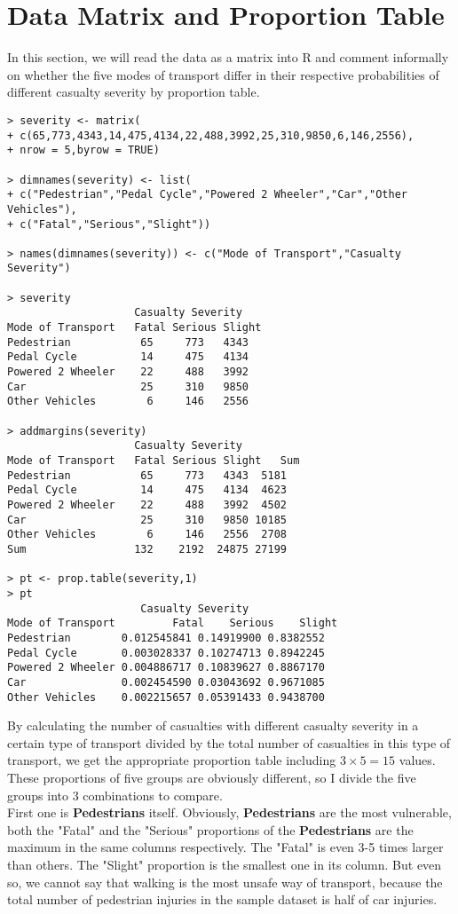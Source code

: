 \documentclass[12pt]{article}
\begin{document}
\section{Data Matrix and Proportion Table}
In this section, we will read the data as a matrix into R and comment informally on whether the five modes of transport differ in their respective probabilities of different casualty severity by proportion table.
\begin{verbatim}
> severity <- matrix(
+ c(65,773,4343,14,475,4134,22,488,3992,25,310,9850,6,146,2556),
+ nrow = 5,byrow = TRUE)
 
> dimnames(severity) <- list(
+ c("Pedestrian","Pedal Cycle","Powered 2 Wheeler","Car","Other Vehicles"),
+ c("Fatal","Serious","Slight"))
  
> names(dimnames(severity)) <- c("Mode of Transport","Casualty Severity")
  
> severity
                    Casualty Severity
Mode of Transport   Fatal Serious Slight
Pedestrian           65     773   4343
Pedal Cycle          14     475   4134
Powered 2 Wheeler    22     488   3992
Car                  25     310   9850
Other Vehicles        6     146   2556
  
> addmargins(severity)
                    Casualty Severity
Mode of Transport   Fatal Serious Slight   Sum
Pedestrian           65     773   4343  5181
Pedal Cycle          14     475   4134  4623
Powered 2 Wheeler    22     488   3992  4502
Car                  25     310   9850 10185
Other Vehicles        6     146   2556  2708
Sum                 132    2192  24875 27199
  
> pt <- prop.table(severity,1)
> pt
                     Casualty Severity
Mode of Transport         Fatal    Serious    Slight
Pedestrian        0.012545841 0.14919900 0.8382552
Pedal Cycle       0.003028337 0.10274713 0.8942245
Powered 2 Wheeler 0.004886717 0.10839627 0.8867170
Car               0.002454590 0.03043692 0.9671085
Other Vehicles    0.002215657 0.05391433 0.9438700
\end{verbatim}
By calculating the number of casualties with different casualty severity in a certain type of transport divided by the total number of casualties in this type of transport, we get the appropriate proportion table including $3 \times 5 = 15$ values. These proportions of five groups are obviously different, so I divide the five groups into 3 combinations to compare.\\[7pt]
First one is \textbf{Pedestrians} itself. Obviously, \textbf{Pedestrians} are the most vulnerable, both the "Fatal" and the "Serious" proportions of the  \textbf{Pedestrians} are the maximum in the same columns respectively.  The "Fatal" is even 3-5 times larger than others. The "Slight" proportion is the smallest one in its column. But even so, we cannot say that walking is the most unsafe way of transport, because the total number of pedestrian injuries in the sample dataset is half of car injuries.\\[8pt]
\end{document}
